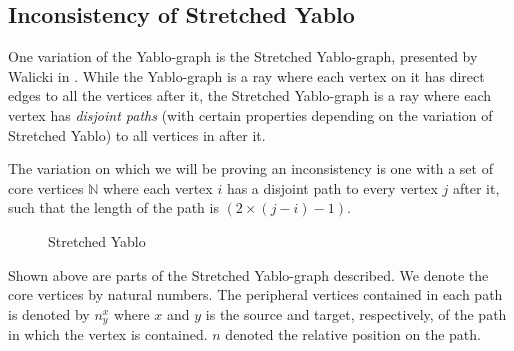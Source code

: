 \subsection{Inconsistency of Stretched Yablo}
\label{sub:Inconsistency of Stretched Yablo}

One variation of the Yablo-graph is the Stretched Yablo-graph, presented by Walicki in \cite{michal-completeness}.
While the Yablo-graph is a ray where each vertex on it has direct edges to all the vertices after it, the Stretched Yablo-graph is a ray where each vertex has \textit{disjoint paths} (with certain properties depending on the variation of Stretched Yablo) to all vertices in after it.

The variation on which we will be proving an inconsistency is one with a set of core vertices $\mathbb{N}$ where each vertex $i$ has a disjoint path to every vertex $j$ after it, such that the length of the path is $(2 \times (j - i) - 1)$.

\begin{figure}[!h]
  \centering
  \caption{Stretched Yablo}
  \label{fig:stretched_yablo}
\end{figure}
Shown above are parts of the Stretched Yablo-graph described.
We denote the core vertices by natural numbers.
The peripheral vertices contained in each path is denoted by $n^x_y$ where $x$ and $y$ is the source and target, respectively, of the path in which the vertex is contained.
$n$ denoted the relative position on the path.

